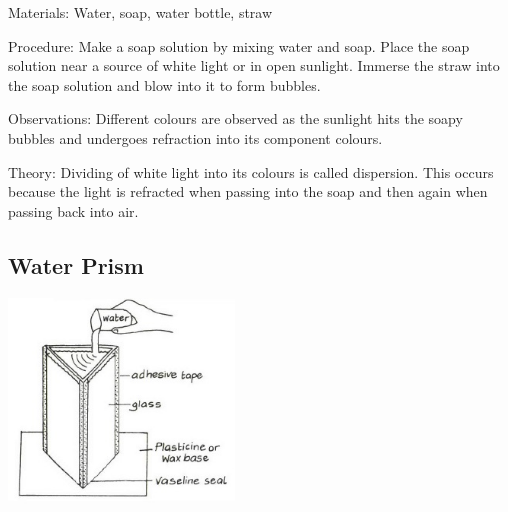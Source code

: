 \begin{multicols}{2}

\begin{description*}
\item[Materials:]{Water, soap, water bottle, straw}
\item[Procedure:]{Make a soap solution by mixing water and soap. Place the soap solution near a source of white light or in open sunlight. Immerse the straw into the soap solution and blow into it to form bubbles.}
\item[Observations:]{Different colours are observed as the sunlight hits the soapy bubbles and undergoes refraction into its component colours.}
\item[Theory:]{Dividing of white light into its colours is called dispersion. This occurs because the light is refracted when passing into the soap and then again when passing back into air.}
\end{description*}

\subsection{Water Prism}

\begin{center}
\includegraphics[width=0.45\textwidth]{./img/vso/water-prism.jpg}
\end{center}


\end{multicols}
